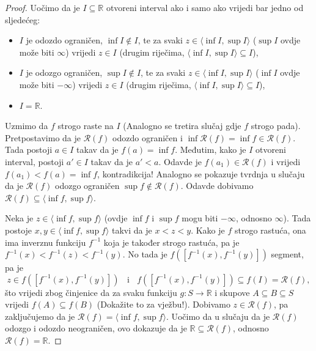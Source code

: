 \begin{proof}
Uočimo da je \(I\subseteq \mathbb{R}\) otvoreni interval ako i samo ako vrijedi bar jedno od sljedećeg:
\begin{itemize}
\item \(I\) je odozdo ograničen, \(\inf{I}\notin I\), te za svaki \(z\in \langle \inf{I}, \sup{I}\rangle\) (\(\sup{I}\) ovdje može biti \(\infty\)) vrijedi \(z\in I\) (drugim riječima, \(\langle \inf{I}, \sup{I}\rangle\subseteq I\)),
\item \(I\) je odozgo ograničen, \(\sup{I}\notin I\), te za svaki \(z\in \langle \inf{I}, \sup{I}\rangle\) (\(\inf{I}\) ovdje može biti \(-\infty\)) vrijedi \(z\in I\) (drugim riječima, \(\langle \inf{I}, \sup{I}\rangle\subseteq I\)),
\item \(I=\mathbb{R}\).
\end{itemize}
Uzmimo da \(f\) strogo raste na \(I\) (Analogno se tretira slučaj gdje \(f\) strogo pada). Pretpostavimo da je \(\mathcal{R}(f)\) odozdo ograničen i \(\inf{\mathcal{R}(f)}=\inf{f}\in \mathcal{R}(f)\). Tada postoji \(a\in I\) takav da je \(f(a)=\inf{f}\). Međutim, kako je \(I\) otvoreni interval, postoji \(a'\in I\) takav da je \(a'<a\). Odavde je \(f(a_1)\in \mathcal{R}(f)\) i vrijedi \(f(a_1)<f(a)=\inf{f}\), kontradikcija! Analogno se pokazuje tvrdnja u slučaju da je \(\mathcal{R}(f)\) odozgo ograničen \(\sup{f}\notin \mathcal{R}(f)\). Odavde dobivamo \(\mathcal{R}(f)\subseteq \langle \inf{f}, \sup{f} \rangle\).

Neka je \(z\in \langle \inf{f}, \sup{f} \rangle\) (ovdje \(\inf{f}\) i \(\sup{f}\) mogu biti \(-\infty\), odnosno \(\infty\)). Tada postoje \(x, y\in \langle \inf{f}, \sup{f} \rangle\) takvi da je \(x<z<y\). Kako je \(f\) strogo rastuća, ona ima inverznu funkciju \(f^{-1}\) koja je također strogo rastuća, pa je \(f^{-1}(x)<f^{-1}(z)<f^{-1}(y)\). No tada je \(f\left(\left[f^{-1}(x), f^{-1}(y)\right]\right)\) segment, pa je \[z\in f\left(\left[f^{-1}(x), f^{-1}(y)\right]\right)\;\;\text{ i }\;\;f\left(\left[f^{-1}(x), f^{-1}(y)\right]\right)\subseteq f(I)=\mathcal{R}(f),\]
što vrijedi zbog činjenice da za svaku funkciju \(g : S\to \mathbb{R}\) i skupove \(A\subseteq B\subseteq S\) vrijedi \(f(A)\subseteq f(B)\) (Dokažite to za vježbu!).
Dobivamo \(z\in \mathcal{R}(f)\), pa zaključujemo da je \(\mathcal{R}(f)=\langle \inf{f}, \sup{f}\rangle\). Uočimo da u slučaju da je \(\mathcal{R}(f)\) odozgo i odozdo neograničen, ovo dokazuje da je \(\mathbb{R}\subseteq \mathcal{R}(f)\), odnosno \(\mathcal{R}(f)=\mathbb{R}\).
\end{proof}
